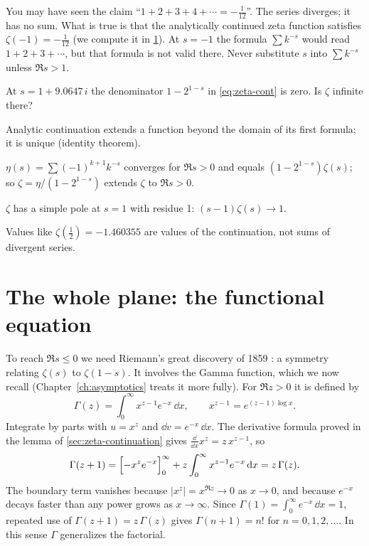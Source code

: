 \begin{pitfall}
You may have seen the claim ``$1+2+3+4+\cdots=-\tfrac1{12}$''. The series diverges; it has no sum. What is true is that the analytically continued zeta function satisfies $\zeta(-1)=-\tfrac1{12}$ (we compute it in \cref{sec:zeta-fe}). At $s=-1$ the formula $\sum k^{-s}$ would read $1+2+3+\cdots$, but that formula is not valid there. Never substitute $s$ into $\sum k^{-s}$ unless $\Re s>1$.
\end{pitfall}

\begin{checkpoint}
At $s=1+9.0647\,i$ the denominator $1-2^{1-s}$ in \cref{eq:zeta-cont} is zero. Is $\zeta$ infinite there?
\end{checkpoint}

\begin{keyideas}
\item Analytic continuation extends a function beyond the domain of its first formula; it is unique (identity theorem).
\item $\eta(s)=\sum(-1)^{k+1}k^{-s}$ converges for $\Re s>0$ and equals $(1-2^{1-s})\zeta(s)$; so $\zeta=\eta/(1-2^{1-s})$ extends $\zeta$ to $\Re s>0$.
\item $\zeta$ has a simple pole at $s=1$ with residue 1: $(s-1)\zeta(s)\to1$.
\item Values like $\zeta(\tfrac12)=-1.460355$ are values of the continuation, not sums of divergent series.
\end{keyideas}

\section{The whole plane: the functional equation}\label{sec:zeta-fe}

To reach $\Re s\le0$ we need Riemann's great discovery of 1859 \cite{riemann1859}: a symmetry relating $\zeta(s)$ to $\zeta(1-s)$. It involves the Gamma function, which we now recall (Chapter~\ref{ch:asymptotics} treats it more fully). For $\Re z>0$ it is defined by
\[
\Gamma(z)=\int_0^\infty x^{z-1}e^{-x}\,\dd x,\qquad x^{z-1}=e^{(z-1)\log x}.
\]
Integrate by parts with $u=x^{z}$ and $\dd v=e^{-x}\,\dd x$. The derivative formula proved in the lemma of \cref{sec:zeta-continuation} gives $\frac{\dd}{\dd x}x^{z}=z\,x^{z-1}$, so
\[
\Gamma(z+1)=\Bigl[-x^{z}e^{-x}\Bigr]_0^\infty+z\int_0^\infty x^{z-1}e^{-x}\,\mathrm{d} x=z\,\Gamma(z).
\]
The boundary term vanishes because $|x^{z}|=x^{\Re z}\to0$ as $x\to0$, and because $e^{-x}$ decays faster than any power grows as $x\to\infty$. Since $\Gamma(1)=\int_0^\infty e^{-x}\,\dd x=1$, repeated use of $\Gamma(z+1)=z\,\Gamma(z)$ gives $\Gamma(n+1)=n!$ for $n=0,1,2,\dots$. In this sense $\Gamma$ generalizes the factorial.

